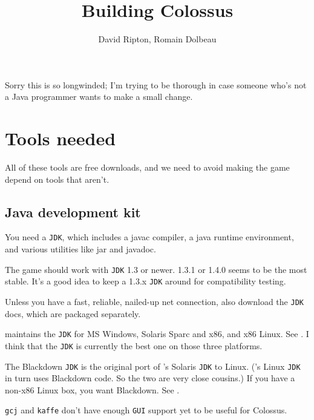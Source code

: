 \documentclass{article}
\begin{document}

\title{Building Colossus}

\author{David Ripton, Romain Dolbeau}

\maketitle

Sorry this is so longwinded; I'm trying to be thorough in case 
someone who's not a Java programmer wants to make a small change.

\section{Tools needed}

All of these tools are free downloads, and we need to avoid making 
the game depend on tools that aren't.

\subsection{Java development kit}

You need a \texttt{JDK}, which includes a javac compiler, a java runtime
environment,  and various utilities like jar and javadoc.

The game should work with \texttt{JDK} 1.3 or newer. 1.3.1 or 1.4.0 seems to be
the most stable.  It's a good idea to keep a 1.3.x \texttt{JDK} around for 
compatibility testing.

Unless you have a fast, reliable, nailed-up net connection, also 
download the \texttt{JDK} docs, which are packaged separately.

 maintains the \texttt{JDK}
for MS Windows, Solaris Sparc and x86, and x86 Linux. See
. I think that the
 \texttt{JDK} is currently
the best one on those three platforms.

The Blackdown \texttt{JDK} is the original port of
's Solaris \texttt{JDK}
to Linux. ('s Linux
\texttt{JDK} in turn uses Blackdown code. So the two are very close cousins.)
If you have a non-x86 Linux box, you want Blackdown. See
.

\texttt{gcj} and \texttt{kaffe} don't have enough \texttt{GUI} support yet to
be useful for Colossus.
\end{document}
